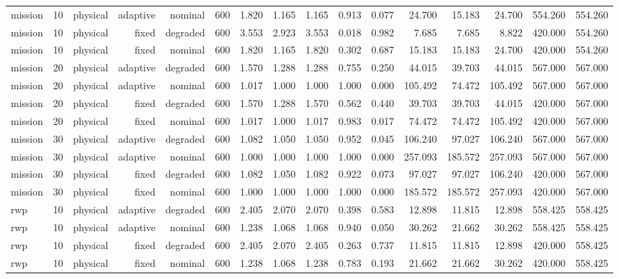 \begin{tabular}{lrrrrrrrrrrrrrrr}
mission & 10 & physical & adaptive & nominal & 600 & 1.820 & 1.165 & 1.165 & 0.913 & 0.077 & 24.700 & 15.183 & 24.700 & 554.260 & 554.260 \\
mission & 10 & physical & fixed & degraded & 600 & 3.553 & 2.923 & 3.553 & 0.018 & 0.982 & 7.685 & 7.685 & 8.822 & 420.000 & 554.260 \\
mission & 10 & physical & fixed & nominal & 600 & 1.820 & 1.165 & 1.820 & 0.302 & 0.687 & 15.183 & 15.183 & 24.700 & 420.000 & 554.260 \\
mission & 20 & physical & adaptive & degraded & 600 & 1.570 & 1.288 & 1.288 & 0.755 & 0.250 & 44.015 & 39.703 & 44.015 & 567.000 & 567.000 \\
mission & 20 & physical & adaptive & nominal & 600 & 1.017 & 1.000 & 1.000 & 1.000 & 0.000 & 105.492 & 74.472 & 105.492 & 567.000 & 567.000 \\
mission & 20 & physical & fixed & degraded & 600 & 1.570 & 1.288 & 1.570 & 0.562 & 0.440 & 39.703 & 39.703 & 44.015 & 420.000 & 567.000 \\
mission & 20 & physical & fixed & nominal & 600 & 1.017 & 1.000 & 1.017 & 0.983 & 0.017 & 74.472 & 74.472 & 105.492 & 420.000 & 567.000 \\
mission & 30 & physical & adaptive & degraded & 600 & 1.082 & 1.050 & 1.050 & 0.952 & 0.045 & 106.240 & 97.027 & 106.240 & 567.000 & 567.000 \\
mission & 30 & physical & adaptive & nominal & 600 & 1.000 & 1.000 & 1.000 & 1.000 & 0.000 & 257.093 & 185.572 & 257.093 & 567.000 & 567.000 \\
mission & 30 & physical & fixed & degraded & 600 & 1.082 & 1.050 & 1.082 & 0.922 & 0.073 & 97.027 & 97.027 & 106.240 & 420.000 & 567.000 \\
mission & 30 & physical & fixed & nominal & 600 & 1.000 & 1.000 & 1.000 & 1.000 & 0.000 & 185.572 & 185.572 & 257.093 & 420.000 & 567.000 \\
rwp & 10 & physical & adaptive & degraded & 600 & 2.405 & 2.070 & 2.070 & 0.398 & 0.583 & 12.898 & 11.815 & 12.898 & 558.425 & 558.425 \\
rwp & 10 & physical & adaptive & nominal & 600 & 1.238 & 1.068 & 1.068 & 0.940 & 0.050 & 30.262 & 21.662 & 30.262 & 558.425 & 558.425 \\
rwp & 10 & physical & fixed & degraded & 600 & 2.405 & 2.070 & 2.405 & 0.263 & 0.737 & 11.815 & 11.815 & 12.898 & 420.000 & 558.425 \\
rwp & 10 & physical & fixed & nominal & 600 & 1.238 & 1.068 & 1.238 & 0.783 & 0.193 & 21.662 & 21.662 & 30.262 & 420.000 & 558.425 \\

\end{tabular}
